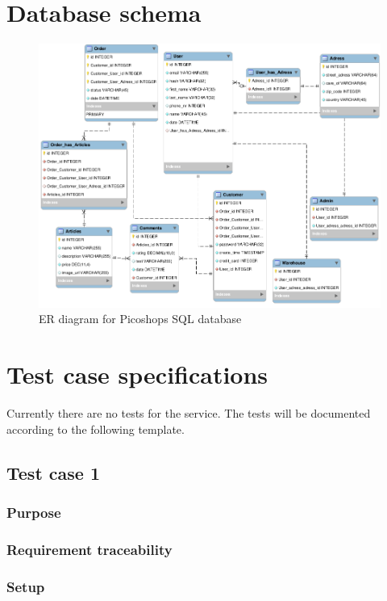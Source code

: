 \documentclass{article}
\begin{document}
\section{Database schema}
\begin{figure}[H]
    \centering
    \includegraphics[width=16cm]{picoshop-sql-er-diagram-rev3.png}
    \caption{ER diagram for Picoshops SQL database}
    \label{fig:er-diagram}
\end{figure}

\newpage
\section{Test case specifications}

Currently there are no tests for the service. The tests will be documented according to the following template.

\bigskip
\hline
\subsection{Test case 1}
\subsubsection*{Purpose}
\subsubsection*{Requirement traceability}
\subsubsection*{Setup}
\end{document}
